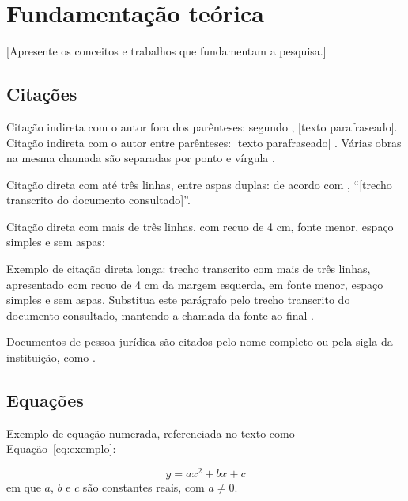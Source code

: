 \chapter{Fundamentação teórica}
\label{cap:fundamentacao-teorica}

[Apresente os conceitos e trabalhos que fundamentam a pesquisa.]

\section{Citações}


Citação indireta com o autor fora dos parênteses: segundo , [texto parafraseado]. Citação indireta com o autor entre parênteses: [texto parafraseado] \cite{leite2013}. Várias obras na mesma chamada são separadas por ponto e vírgula \cite{angeloni2008,oliveira2013}.

Citação direta com até três linhas, entre aspas duplas: de acordo com , ``[trecho transcrito do documento consultado]''.

Citação direta com mais de três linhas, com recuo de 4 cm, fonte menor, espaço simples e sem aspas:

\begin{citacao}
Exemplo de citação direta longa: trecho transcrito com mais de três linhas, apresentado com recuo de 4 cm da margem esquerda, em fonte menor, espaço simples e sem aspas. Substitua este parágrafo pelo trecho transcrito do documento consultado, mantendo a chamada da fonte ao final \cite[p. 160]{oliveira2013}.
\end{citacao}

Documentos de pessoa jurídica são citados pelo nome completo ou pela sigla da instituição, como \cite{abnt2023}.

\section{Equações}


Exemplo de equação numerada, referenciada no texto como Equação~\eqref{eq:exemplo}:

\begin{equation}
	y = a x^{2} + b x + c
	\label{eq:exemplo}
\end{equation}
em que $a$, $b$ e $c$ são constantes reais, com $a \neq 0$.
